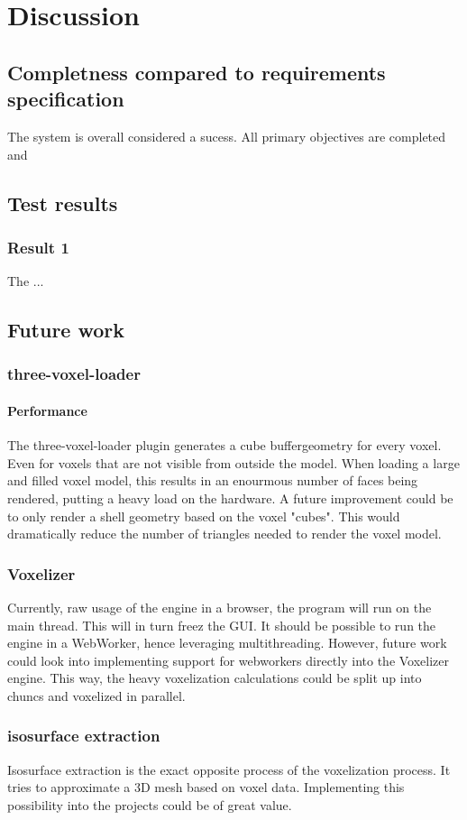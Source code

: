 \chapter{Discussion}
\section{Completness compared to requirements specification}
The system is overall considered a sucess. All primary objectives are completed and 

\section{Test results}

\subsection{Result 1}\label{platformDesAndBuo}
The ...
\section{Future work}

\subsection{three-voxel-loader}
\subsubsection{Performance}
The three-voxel-loader plugin generates a cube buffergeometry for every voxel. Even for voxels that are not visible from outside the model. When loading a large and filled voxel model, this results in an enourmous number of faces being rendered, putting a heavy load on the hardware. A future improvement could be to only render a shell geometry based on the voxel "cubes". This would dramatically reduce the number of triangles needed to render the voxel model.

\subsection{Voxelizer}
Currently, raw usage of the engine in a browser, the program will run on the main thread. This will in turn freez the GUI. It should be possible to run the engine in a WebWorker, hence leveraging multithreading. However, future work could look into implementing support for webworkers directly into the Voxelizer engine. This way, the heavy voxelization calculations could be split up into chuncs and voxelized in parallel.

\subsection{isosurface extraction}
Isosurface extraction is the exact opposite process of the voxelization process. It tries to approximate a 3D mesh based on voxel data. Implementing this possibility into the projects could be of great value.